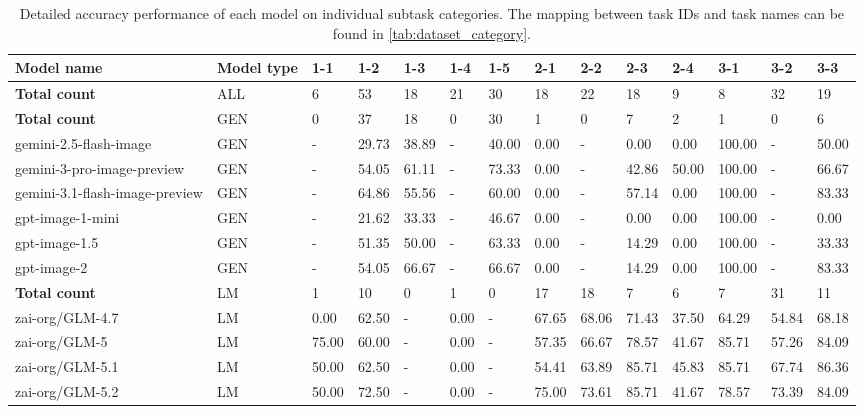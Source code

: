 \begin{table}[htbp!]
\centering
\caption{Detailed accuracy performance of each model on individual subtask categories. The mapping between task IDs and task names can be found in \autoref{tab:dataset_category}.}
\label{tab:analyses_category}
\setlength{\tabcolsep}{3pt}
\begin{adjustbox}{max width=\textwidth}
\begin{tabular}{llllllllllllll}
\toprule
\textbf{Model name} & \textbf{Model type} & \textbf{1-1} & \textbf{1-2} & \textbf{1-3} & \textbf{1-4} & \textbf{1-5} & \textbf{2-1} & \textbf{2-2} & \textbf{2-3} & \textbf{2-4} & \textbf{3-1} & \textbf{3-2} & \textbf{3-3}  \\
\midrule
\bf Total count & ALL & 6 & 53 & 18 & 21 & 30 & 18 & 22 & 18 & 9 & 8 & 32 & 19  \\
\midrule
\bf Total count & GEN & 0 & 37 & 18 & 0 & 30 & 1 & 0 & 7 & 2 & 1 & 0 & 6  \\
\hdashline
gemini-2.5-flash-image & GEN & - & 29.73 & 38.89 & - & 40.00 & 0.00 & - & 0.00 & 0.00 & 100.00 & - & 50.00   \\
gemini-3-pro-image-preview & GEN & - & 54.05 & 61.11 & - & 73.33 & 0.00 & - & 42.86 & 50.00 & 100.00 & - & 66.67 \\
gemini-3.1-flash-image-preview & GEN & - & 64.86 & 55.56 & - & 60.00 & 0.00 & - & 57.14 & 0.00 & 100.00 & - & 83.33   \\
gpt-image-1-mini & GEN & - & 21.62 & 33.33 & - & 46.67 & 0.00 & - & 0.00 & 0.00 & 100.00 & - & 0.00   \\
gpt-image-1.5 & GEN & - & 51.35 & 50.00 & - & 63.33 & 0.00 & - & 14.29 & 0.00 & 100.00 & - & 33.33  \\
gpt-image-2 & GEN & - & 54.05 & 66.67 & - & 66.67 & 0.00 & - & 14.29 & 0.00 & 100.00 & - & 83.33   \\
\midrule
\bf Total count & LM & 1 & 10 & 0 & 1 & 0 & 17 & 18 & 7 & 6 & 7 & 31 & 11 \\
\hdashline
zai-org/GLM-4.7 & LM & 0.00 & 62.50 & - & 0.00 & - & 67.65 & 68.06 & 71.43 & 37.50 & 64.29 & 54.84 & 68.18   \\
zai-org/GLM-5 & LM & 75.00 & 60.00 & - & 0.00 & - & 57.35 & 66.67 & 78.57 & 41.67 & 85.71 & 57.26 & 84.09  \\
zai-org/GLM-5.1 & LM & 50.00 & 62.50 & - & 0.00 & - & 54.41 & 63.89 & 85.71 & 45.83 & 85.71 & 67.74 & 86.36   \\
zai-org/GLM-5.2 & LM & 50.00 & 72.50 & - & 0.00 & - & 75.00 & 73.61 & 85.71 & 41.67 & 78.57 & 73.39 & 84.09 \\

\end{tabular}
\end{adjustbox}
\end{table}
